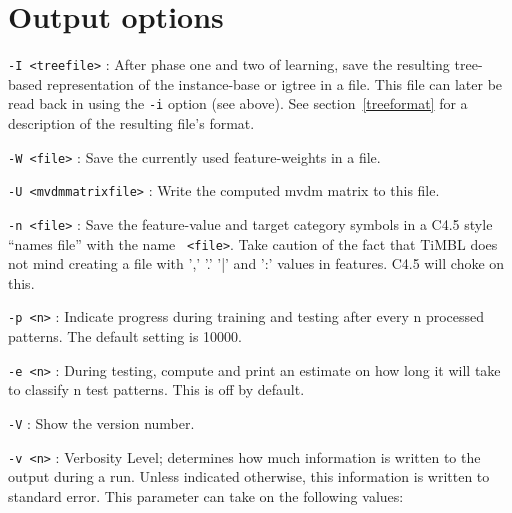\documentclass{report}
\begin{document}
\section{Output options}

\begin{description}

\item {\tt -I <treefile>} : After phase one and two of learning, save
the resulting tree-based representation of the instance-base or {\sc igtree}
in a file. This file can later be read back in using the {\tt -i} option
(see above). See section~\ref{treeformat} for a description of the resulting
file's format.


\item {\tt -W <file>} : Save the currently used feature-weights in a
file.

\item {\tt -U <mvdmmatrixfile>} : Write the computed {\sc mvdm} matrix to
this file.

\item {\tt -n <file>} : Save the feature-value and target category
symbols in a C4.5 style ``names file'' with the name {\tt
<file>}. Take caution of the fact that TiMBL does not mind creating a
file with ',' '.' '|' and ':' values in features. C4.5 will choke on this.

\item {\tt -p <n>} : Indicate progress during training and testing
after every n processed patterns. The default setting is 10000.

\item {\tt -e <n>} : During testing, compute and print an estimate on
how long it will take to classify n test patterns. This is off by
default.

\item {\tt -V} : Show the version number.

\item {\tt -v <n>} : Verbosity Level; determines how much information
is written to the output during a run. Unless indicated otherwise,
this information is written to standard error. This parameter can
take on the following values:


\end{description}
\end{document}

